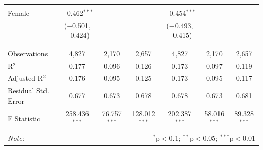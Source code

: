 \documentclass[12pt,a4paper]{article}
\numberwithin{equation}{section}
\begin{document}
\begin{landscape}
\begin{table}[!htbp]
\begin{tabular}{@{\extracolsep{5pt}}lcccccc}
			& & & & & & \\ 
			Female & $-$0.462$^{***}$ &  &  & $-$0.454$^{***}$ &  &  \\ 
			& ($-$0.501, $-$0.424) &  &  & ($-$0.493, $-$0.415) &  &  \\ 
			& & & & & & \\ 
			\hline \\[-1.8ex] 
			Observations & 4,827 & 2,170 & 2,657 & 4,827 & 2,170 & 2,657 \\ 
			R$^{2}$ & 0.177 & 0.096 & 0.126 & 0.173 & 0.097 & 0.119 \\ 
			Adjusted R$^{2}$ & 0.176 & 0.095 & 0.125 & 0.173 & 0.095 & 0.117 \\ 
			Residual Std. Error & 0.677 & 0.673 & 0.678 & 0.678 & 0.673 & 0.681 \\ 
			F Statistic & 258.436$^{***}$ & 76.757$^{***}$ & 128.012$^{***}$ & 202.387$^{***}$ & 58.016$^{***}$ & 89.328$^{***}$ \\ 
			\hline 
			\hline \\[-1.8ex] 
			\textit{Note:}  & \multicolumn{6}{r}{$^{*}$p$<$0.1; $^{**}$p$<$0.05; $^{***}$p$<$0.01} \\ 
		\end{tabular} 
	\end{table} 
	
\end{landscape}

\newpage
\end{document}
